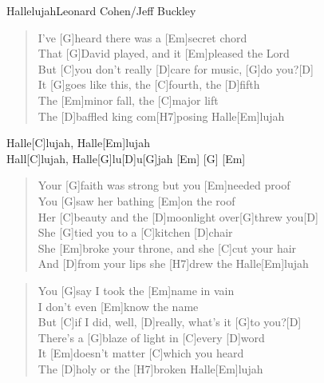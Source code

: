 \begin{song}{Hallelujah}{Leonard Cohen/Jeff Buckley}

    \begin{verse}  
        I've [G]heard there was a [Em]secret chord \\
        That [G]David played, and it [Em]pleased the Lord \\
        But [C]you don't really [D]care for music, [G]do you?[D] \\
        It [G]goes like this, the [C]fourth, the [D]fifth \\
        The [Em]minor fall, the [C]major lift \\
        The [D]baffled king com[H7]posing Halle[Em]lujah
    \end{verse}  

    \begin{chorus}
        Halle[C]lujah, Halle[Em]lujah \\
        Hall[C]lujah, Halle[G]lu[D]u[G]jah [Em] \hspace{1em} [G] \hspace{1em} [Em]
    \end{chorus}

    \begin{verse}  
        Your [G]faith was strong but you [Em]needed proof \\
        You [G]saw her bathing [Em]on the roof \\
        Her [C]beauty and the [D]moonlight over[G]threw you[D] \\
        She [G]tied you to a [C]kitchen [D]chair \\
        She [Em]broke your throne, and she [C]cut your hair \\
        And [D]from your lips she [H7]drew the Halle[Em]lujah
    \end{verse}  


    \begin{verse}  
        You [G]say I took the [Em]name in vain \\
        [G]I don't even [Em]know the name \\
        But [C]if I did, well, [D]really, what's it [G]to you?[D] \\
        There's a [G]blaze of light in [C]every [D]word \\
        It [Em]doesn't matter [C]which you heard \\
        The [D]holy or the [H7]broken Halle[Em]lujah
    \end{verse}  


\end{song}
